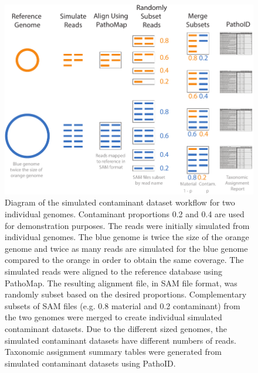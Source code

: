 \documentclass[fleqn,10pt,lineno]{wlpeerj}\usepackage[]{graphicx}\usepackage[]{color}
\makeatletter
\def\maxwidth{ %
  \ifdim\Gin@nat@width>\linewidth
    \linewidth
  \else
    \Gin@nat@width
  \fi
}
\newenvironment{knitrout}{}{} %
\makeatother
\begin{document}
\begin{knitrout}
\color{fgcolor}\begin{figure}
\includegraphics[width=\maxwidth]{figure/contam_simulation} \caption[Diagram of the simulated contaminant dataset workflow for two individual genomes]{Diagram of the simulated contaminant dataset workflow for two individual genomes. Contaminant proportions 0.2 and 0.4 are used for demonstration purposes. The reads were initially simulated from individual genomes. The blue genome is twice the size of the orange genome and twice as many reads are simulated for the blue genome compared to the orange in order to obtain the same coverage. The simulated reads were aligned to the reference database using PathoMap. The resulting alignment file, in SAM file format, was randomly subset based on the desired proportions. Complementary subsets of SAM files (e.g. 0.8 material and 0.2 contaminant) from the two genomes were merged to create individual simulated contaminant datasets.  Due to the different sized genomes, the simulated contaminant datasets have different numbers of reads. Taxonomic assignment summary tables were generated from simulated contaminant datasets using PathoID.}\label{fig:contam_simulation}
\end{figure}


\end{knitrout}
\end{document}

